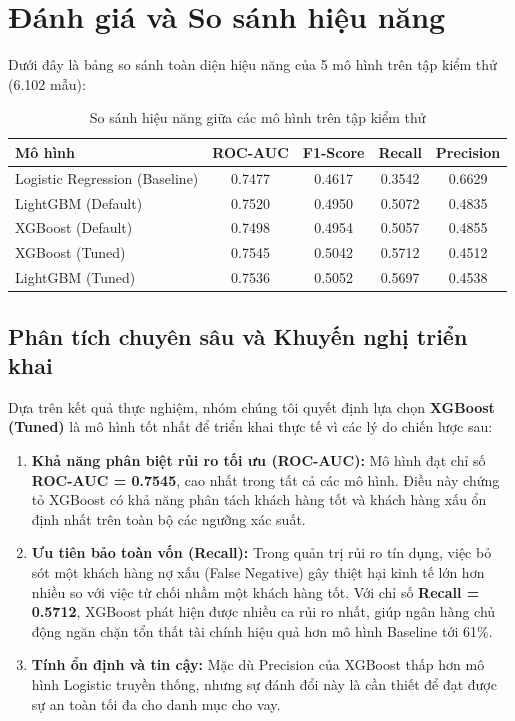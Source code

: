 \section{Đánh giá và So sánh hiệu năng}
Dưới đây là bảng so sánh toàn diện hiệu năng của 5 mô hình trên tập kiểm thử (6.102 mẫu):

\begin{table}[H]
    \centering
    \caption{So sánh hiệu năng giữa các mô hình trên tập kiểm thử}
    \label{tab:results}
    \begin{tabular}{|l|c|c|c|c|}
        \hline
        \rowcolor{Gray}
        \textbf{Mô hình} & \textbf{ROC-AUC} & \textbf{F1-Score} & \textbf{Recall} & \textbf{Precision} \\ \hline
        Logistic Regression (Baseline) & 0.7477 & 0.4617 & 0.3542 & 0.6629 \\ \hline
        LightGBM (Default) & 0.7520 & 0.4950 & 0.5072 & 0.4835 \\ \hline
        XGBoost (Default) & 0.7498 & 0.4954 & 0.5057 & 0.4855 \\ \hline
        XGBoost (Tuned) & 0.7545 & 0.5042 & 0.5712 & 0.4512 \\ \hline
        LightGBM (Tuned) & 0.7536 & 0.5052 & 0.5697 & 0.4538 \\ \hline
    \end{tabular}
\end{table}


\subsection{Phân tích chuyên sâu và Khuyến nghị triển khai}

Dựa trên kết quả thực nghiệm, nhóm chúng tôi quyết định lựa chọn \textbf{XGBoost (Tuned)} là mô hình tốt nhất để triển khai thực tế vì các lý do chiến lược sau:

\begin{enumerate}
    \item \textbf{Khả năng phân biệt rủi ro tối ưu (ROC-AUC):} Mô hình đạt chỉ số \textbf{ROC-AUC = 0.7545}, cao nhất trong tất cả các mô hình. Điều này chứng tỏ XGBoost có khả năng phân tách khách hàng tốt và khách hàng xấu ổn định nhất trên toàn bộ các ngưỡng xác suất.
    \item \textbf{Ưu tiên bảo toàn vốn (Recall):} Trong quản trị rủi ro tín dụng, việc bỏ sót một khách hàng nợ xấu (False Negative) gây thiệt hại kinh tế lớn hơn nhiều so với việc từ chối nhầm một khách hàng tốt. Với chỉ số \textbf{Recall = 0.5712}, XGBoost phát hiện được nhiều ca rủi ro nhất, giúp ngân hàng chủ động ngăn chặn tổn thất tài chính hiệu quả hơn mô hình Baseline tới 61\%.
    \item \textbf{Tính ổn định và tin cậy:} Mặc dù Precision của XGBoost thấp hơn mô hình Logistic truyền thống, nhưng sự đánh đổi này là cần thiết để đạt được sự an toàn tối đa cho danh mục cho vay.
\end{enumerate}

